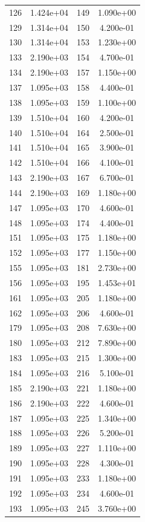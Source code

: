 \documentclass[12pt]{article}
\begin{document}
\begin{longtable}{@{}cccc@{}}
126 & 1.424e+04 & 149 & 1.090e+00 \\
129 & 1.314e+04 & 150 & 4.200e-01 \\
130 & 1.314e+04 & 153 & 1.230e+00 \\
133 & 2.190e+03 & 154 & 4.700e-01 \\
134 & 2.190e+03 & 157 & 1.150e+00 \\
137 & 1.095e+03 & 158 & 4.400e-01 \\
138 & 1.095e+03 & 159 & 1.100e+00 \\
139 & 1.510e+04 & 160 & 4.200e-01 \\
140 & 1.510e+04 & 164 & 2.500e-01 \\
141 & 1.510e+04 & 165 & 3.900e-01 \\
142 & 1.510e+04 & 166 & 4.100e-01 \\
143 & 2.190e+03 & 167 & 6.700e-01 \\
144 & 2.190e+03 & 169 & 1.180e+00 \\
147 & 1.095e+03 & 170 & 4.600e-01 \\
148 & 1.095e+03 & 174 & 4.400e-01 \\
151 & 1.095e+03 & 175 & 1.180e+00 \\
152 & 1.095e+03 & 177 & 1.150e+00 \\
155 & 1.095e+03 & 181 & 2.730e+00 \\
156 & 1.095e+03 & 195 & 1.453e+01 \\
161 & 1.095e+03 & 205 & 1.180e+00 \\
162 & 1.095e+03 & 206 & 4.600e-01 \\
179 & 1.095e+03 & 208 & 7.630e+00 \\
180 & 1.095e+03 & 212 & 7.890e+00 \\
183 & 1.095e+03 & 215 & 1.300e+00 \\
184 & 1.095e+03 & 216 & 5.100e-01 \\
185 & 2.190e+03 & 221 & 1.180e+00 \\
186 & 2.190e+03 & 222 & 4.600e-01 \\
187 & 1.095e+03 & 225 & 1.340e+00 \\
188 & 1.095e+03 & 226 & 5.200e-01 \\
189 & 1.095e+03 & 227 & 1.110e+00 \\
190 & 1.095e+03 & 228 & 4.300e-01 \\
191 & 1.095e+03 & 233 & 1.180e+00 \\
192 & 1.095e+03 & 234 & 4.600e-01 \\
193 & 1.095e+03 & 245 & 3.760e+00 \\

\end{longtable}
\end{document}
